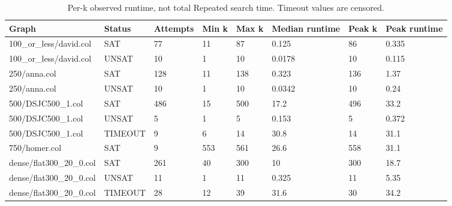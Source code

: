 \begin{table}[htbp]
\centering
\caption{Per-k observed runtime, not total Repeated search time. Timeout values are censored.}
\label{tab:p3-summary}
\begin{tabular}{llllllll}
\hline
Graph & Status & Attempts & Min k & Max k & Median runtime & Peak k & Peak runtime \\
\hline
100\_or\_less/david.col & SAT & 77 & 11 & 87 & 0.125 & 86 & 0.335 \\
100\_or\_less/david.col & UNSAT & 10 & 1 & 10 & 0.0178 & 10 & 0.115 \\
250/anna.col & SAT & 128 & 11 & 138 & 0.323 & 136 & 1.37 \\
250/anna.col & UNSAT & 10 & 1 & 10 & 0.0342 & 10 & 0.24 \\
500/DSJC500\_1.col & SAT & 486 & 15 & 500 & 17.2 & 496 & 33.2 \\
500/DSJC500\_1.col & UNSAT & 5 & 1 & 5 & 0.153 & 5 & 0.372 \\
500/DSJC500\_1.col & TIMEOUT & 9 & 6 & 14 & 30.8 & 14 & 31.1 \\
750/homer.col & SAT & 9 & 553 & 561 & 26.6 & 558 & 31.1 \\
dense/flat300\_20\_0.col & SAT & 261 & 40 & 300 & 10 & 300 & 18.7 \\
dense/flat300\_20\_0.col & UNSAT & 11 & 1 & 11 & 0.325 & 11 & 5.35 \\
dense/flat300\_20\_0.col & TIMEOUT & 28 & 12 & 39 & 31.6 & 30 & 34.2 \\
\hline
\end{tabular}
\end{table}
